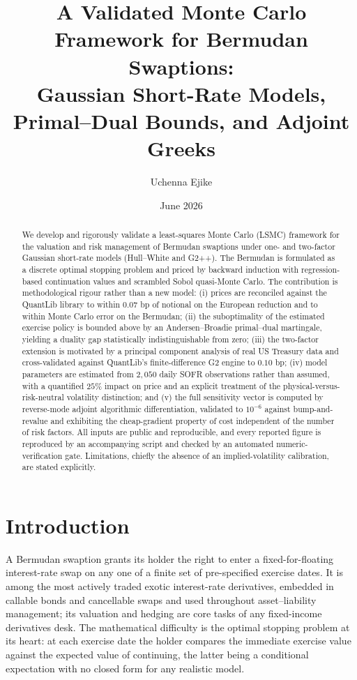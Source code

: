 \documentclass[11pt]{article}
\title{\textbf{A Validated Monte Carlo Framework for Bermudan Swaptions:\\
Gaussian Short-Rate Models, Primal--Dual Bounds, and Adjoint Greeks}}
\author{Uchenna Ejike}
\date{June 2026}
\theoremstyle{plain}
\theoremstyle{definition}
\begin{document}
\maketitle

\begin{abstract}
\noindent We develop and rigorously validate a least-squares Monte Carlo (LSMC) framework for
the valuation and risk management of Bermudan swaptions under one- and two-factor Gaussian
short-rate models (Hull--White and G2++). The Bermudan is formulated as a discrete optimal
stopping problem and priced by backward induction with regression-based continuation values
and scrambled Sobol quasi-Monte Carlo. The contribution is methodological rigour rather than
a new model: (i) prices are reconciled against the QuantLib library to within $0.07$ bp of
notional on the European reduction and to within Monte Carlo error on the Bermudan;
(ii) the suboptimality of the estimated exercise policy is bounded above by an
Andersen--Broadie primal--dual martingale, yielding a duality gap statistically
indistinguishable from zero; (iii) the two-factor extension is motivated by a principal
component analysis of real US Treasury data and cross-validated against QuantLib's
finite-difference G2 engine to $0.10$ bp; (iv) model parameters are estimated from $2{,}050$
daily SOFR observations rather than assumed, with a quantified $25\%$ impact on price and an
explicit treatment of the physical-versus-risk-neutral volatility distinction; and (v) the full
sensitivity vector is computed by reverse-mode adjoint algorithmic differentiation, validated
to $10^{-6}$ against bump-and-revalue and exhibiting the cheap-gradient property of cost
independent of the number of risk factors. All inputs are public and reproducible, and every
reported figure is reproduced by an accompanying script and checked by an automated
numeric-verification gate. Limitations, chiefly the absence of an implied-volatility
calibration, are stated explicitly.
\end{abstract}

\section{Introduction}

A Bermudan swaption grants its holder the right to enter a fixed-for-floating interest-rate
swap on any one of a finite set of pre-specified exercise dates. It is among the most actively
traded exotic interest-rate derivatives, embedded in callable bonds and cancellable swaps and
used throughout asset--liability management; its valuation and hedging are core tasks of any
fixed-income derivatives desk. The mathematical difficulty is the optimal stopping problem at
its heart: at each exercise date the holder compares the immediate exercise value against the
expected value of continuing, the latter being a conditional expectation with no closed form
for any realistic model.
\end{document}
